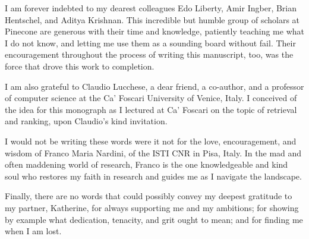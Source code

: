 
I am forever indebted to my dearest colleagues Edo Liberty, Amir Ingber,
Brian Hentschel, and Aditya Krishnan. This incredible but humble group
of scholars at Pinecone are generous with their time and knowledge,
patiently teaching me what I do not know,
and letting me use them as a sounding board without fail.
Their encouragement throughout the process of writing this manuscript,
too, was the force that drove this work to completion.

I am also grateful to Claudio Lucchese, a dear friend, a co-author,
and a professor of computer science at the Ca' Foscari University of Venice, Italy.
I conceived of the idea for this monograph as I lectured at Ca' Foscari
on the topic of retrieval and ranking, upon Claudio's kind invitation.

I would not be writing these words were it not for
the love, encouragement, and wisdom of Franco Maria Nardini,
of the ISTI CNR in Pisa, Italy. In the mad and often maddening world of research,
Franco is the one knowledgeable and kind soul who
restores my faith in research and guides me as I navigate the landscape.

Finally, there are no words that could possibly convey my deepest gratitude
to my partner, Katherine, for always supporting me and my ambitions;
for showing by example what dedication, tenacity, and grit ought to mean;
and for finding me when I am lost.